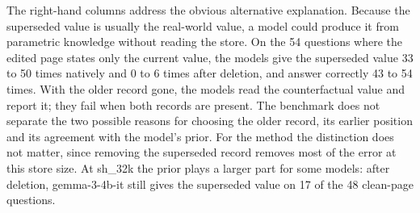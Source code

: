 \documentclass[11pt]{article}
\newcommand{\sub}[1]{\textsf{sh\_#1}}                    %
\begin{document}
\begin{table}[tbp]\centering
\caption{Native errors on the 74 conflicted questions of \sub{6k}, and a within-question control. ``Clean page'' denotes the 54 conflicted questions for which the deletion plan removes every superseded version of the queried key and keeps the newest, so that the edited page states only the current value. The set is fixed by the plan and is the same for all models.}
\label{tab:errors}
\end{table}

The right-hand columns address the obvious alternative explanation. Because the superseded value is usually the real-world value, a model could produce it from parametric knowledge without reading the store. On the 54 questions where the edited page states only the current value, the models give the superseded value 33 to 50 times natively and 0 to 6 times after deletion, and answer correctly 43 to 54 times. With the older record gone, the models read the counterfactual value and report it; they fail when both records are present. The benchmark does not separate the two possible reasons for choosing the older record, its earlier position and its agreement with the model's prior. %
For the method the distinction does not matter, since removing the superseded record removes most of the error at this store size. At \sub{32k} the prior plays a larger part for some models: after deletion, gemma-3-4b-it still gives the superseded value on 17 of the 48 clean-page questions.
\end{document}
